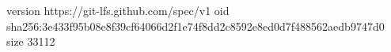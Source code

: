 version https://git-lfs.github.com/spec/v1
oid sha256:3e433f95b08e8f39cf64066d2f1e74f8dd2c8592e8ed0d7f488562aedb9747d0
size 33112

